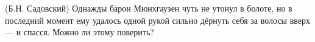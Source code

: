 (Б.Н. Садовский)
Однажды барон Мюнхгаузен чуть не утонул в болоте, но в последний момент
ему удалось одной рукой сильно дёрнуть себя за волосы вверх --- и
спасся. Можно ли этому поверить?
